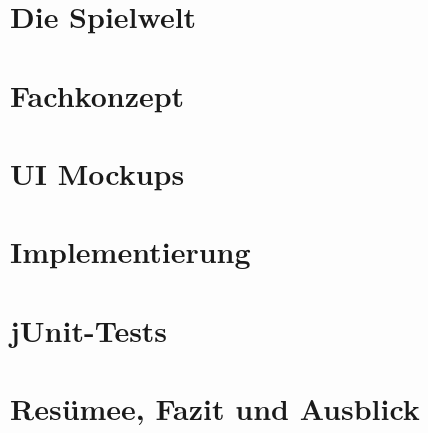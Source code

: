 \chapter{Die Spielwelt}
%
%



\chapter{Fachkonzept}



\chapter{UI Mockups}



\chapter{Implementierung}



\chapter{jUnit-Tests}



\chapter{Resümee, Fazit und Ausblick}





% 
%



%



%
%
%
%
\newpage
\sePrintGlossary{}


%
%

%


%
%
% 

